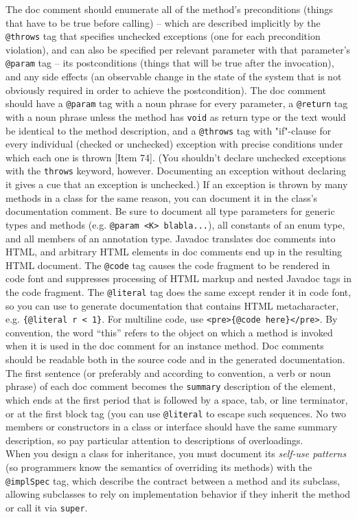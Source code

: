 \documentclass[8pt, table, xcdraw]{article}%
\begin{document}
The doc comment should enumerate all of the method’s preconditions (things that have to be true before calling) -- which are described implicitly by the \lstinline{@throws} tag that specifies unchecked exceptions (one for each precondition violation), and can also be specified per relevant parameter with that parameter's \lstinline{@param} tag -- its postconditions (things that will be true after the invocation), and any side effects (an observable change in the state of the system that is not obviously required in order to achieve the postcondition). The doc comment should have a \lstinline{@param} tag with a noun phrase for every parameter, a \lstinline{@return} tag with a noun phrase unless the method has \lstinline{void} as return type or the text would be identical to the method description, and a \lstinline{@throws} tag with "if"-clause for every individual (checked or unchecked) exception with precise conditions under which each one is thrown [Item 74]. (You shouldn't declare unchecked exceptions with the \lstinline{throws} keyword, however. Documenting an exception without declaring it gives a cue that an exception is unchecked.) If an exception is thrown by many methods in a class for the same reason, you can document it in the class’s documentation comment. Be sure to document all type parameters for generic types and methods (e.g. \lstinline{@param <K> blabla...}), all constants of an enum type, and all members of an annotation type. Javadoc translates doc comments into HTML, and arbitrary HTML elements in doc comments end up in the resulting HTML document. The \lstinline{@code} tag causes the code fragment to be rendered in code font and suppresses processing of HTML markup and nested Javadoc tags in the code fragment. The \lstinline{@literal} tag does the same except render it in code font, so you can use to generate documentation that contains HTML metacharacter, e.g. \lstinline|{@literal r < 1}|. For multiline code, use \lstinline|<pre>{@code here}</pre>|. By convention, the word “this” refers to the object on which a method is invoked when it is used in the doc comment for an instance method. Doc comments should be readable both in the source code and in the generated documentation. The first sentence (or preferably and according to convention, a verb or noun phrase) of each doc comment becomes the \lstinline{summary} description of the element, which ends at the first period that is followed by a space, tab, or line terminator, or at the first block tag (you can use \lstinline{@literal} to escape such sequences. No two members or constructors in a class or interface should have the same summary description, so pay particular attention to descriptions of overloadings.\\
When you design a class for inheritance, you must document its \emph{self-use patterns} (so programmers know the semantics of overriding its methods) with the \lstinline{@implSpec} tag, which describe the contract between a method and its subclass, allowing subclasses to rely on implementation behavior if they inherit the method or call it via \lstinline{super}.
\end{document}
